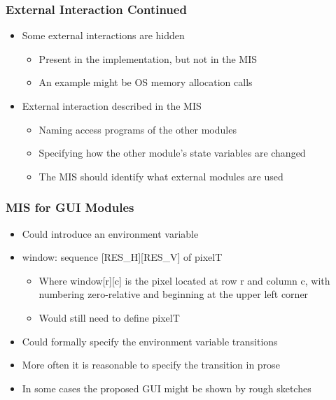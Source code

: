 \documentclass[t,12pt,numbers,fleqn,handout]{beamer}
\begin{document}

\begin{frame}
\frametitle{External Interaction Continued}

\begin{itemize}
\item Some external interactions are hidden
\begin{itemize}
\item Present in the implementation, but not in the MIS
\item An example might be OS memory allocation calls
\end{itemize}
\item External interaction described in the MIS
\begin{itemize}
\item Naming access programs of the other modules
\item Specifying how the other module's state variables are changed
\item The MIS should identify what external modules are used
\end{itemize}
\end{itemize}

\end{frame}


\begin{frame}
\frametitle{MIS for GUI Modules}

\begin{itemize}
\item Could introduce an environment variable
\item window: sequence [RES\_H][RES\_V] of pixelT
\begin{itemize}
\item Where window[r][c] is the pixel located at row r and column c, with numbering zero-relative and beginning at the
upper left corner
\item Would still need to define pixelT
\end{itemize}
\item Could formally specify the environment variable transitions
\item More often it is reasonable to specify the transition in prose
\item In some cases the proposed GUI might be shown by rough sketches
\end{itemize}

\end{frame}
\end{document}
